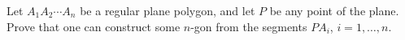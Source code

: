 Let $A_1A_2 \cdots A_n$ be a regular plane polygon, and let $P$ be any point of the plane. Prove that one can construct some $n$-gon from the segments $PA_i$, $i = 1, \ldots, n$.
